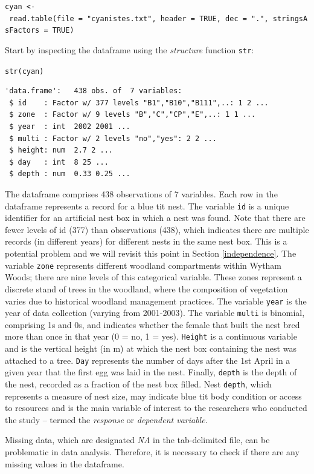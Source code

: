 \documentclass[
]{book}
\begin{document}
\texttt{cyan\ \textless{}-\ read.table(file\ =\ "cyanistes.txt",\ header\ =\ TRUE,\ dec\ =\ ".",\ stringsAsFactors\ =\ TRUE)}

Start by inspecting the dataframe using the \emph{structure} function \texttt{str}:

\texttt{str(cyan)}

\begin{verbatim}
'data.frame':   438 obs. of  7 variables:
 $ id    : Factor w/ 377 levels "B1","B10","B111",..: 1 2 ...
 $ zone  : Factor w/ 9 levels "B","C","CP","E",..: 1 1 ...
 $ year  : int  2002 2001 ...
 $ multi : Factor w/ 2 levels "no","yes": 2 2 ...
 $ height: num  2.7 2 ...
 $ day   : int  8 25 ...
 $ depth : num  0.33 0.25 ...
\end{verbatim}

The dataframe comprises 438 observations of 7 variables. Each row in the dataframe represents a record for a blue tit nest. The variable \texttt{id} is a unique identifier for an artificial nest box in which a nest was found. Note that there are fewer levels of id (377) than observations (438), which indicates there are multiple records (in different years) for different nests in the same nest box. This is a potential problem and we will revisit this point in Section \ref{independence}. The variable \texttt{zone} represents different woodland compartments within Wytham Woods; there are nine levels of this categorical variable. These zones represent a discrete stand of trees in the woodland, where the composition of vegetation varies due to historical woodland management practices. The variable \texttt{year} is the year of data collection (varying from 2001-2003). The variable \texttt{multi} is binomial, comprising 1s and 0s, and indicates whether the female that built the nest bred more than once in that year (0 = no, 1 = yes). \texttt{Height} is a continuous variable and is the vertical height (in m) at which the nest box containing the nest was attached to a tree. \texttt{Day} represents the number of days after the 1st April in a given year that the first egg was laid in the nest. Finally, \texttt{depth} is the depth of the nest, recorded as a fraction of the nest box filled. Nest \texttt{depth}, which represents a measure of nest size, may indicate blue tit body condition or access to resources and is the main variable of interest to the researchers who conducted the study -- termed the \emph{response} or \emph{dependent variable}.

Missing data, which are designated \emph{NA} in the tab-delimited file, can be problematic in data analysis. Therefore, it is necessary to check if there are any missing values in the dataframe.
\end{document}

